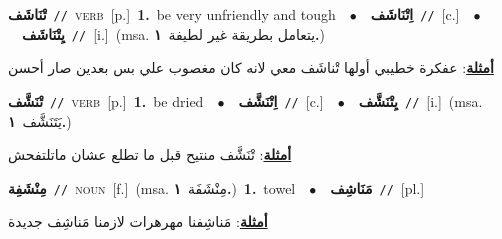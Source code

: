 \documentclass[10pt,a4paper,twoside]{article} %
\begin{document}
\begin{multicols}{2}
{\setlength\topsep{0pt}\textbf{\foreignlanguage{arabic}{تْنَاشَف}}\ {\color{gray}\texttt{//}\color{black}}\ \textsc{verb}\ [p.]\ \textbf{1.}~be very unfriendly and tough\ \ $\bullet$\ \ \setlength\topsep{0pt}\textbf{\foreignlanguage{arabic}{اِتْنَاشَف}}\ {\color{gray}\texttt{//}\color{black}}\ [c.]\ \ $\bullet$\ \ \setlength\topsep{0pt}\textbf{\foreignlanguage{arabic}{يِتْنَاشَف}}\ {\color{gray}\texttt{//}\color{black}}\ [i.]\ \color{gray}(msa. \foreignlanguage{arabic}{يتعامل بطريقة غير لطيفة}~\foreignlanguage{arabic}{\textbf{١.}})\color{black}\  \begin{flushright}\color{gray}\foreignlanguage{arabic}{\textbf{\underline{\foreignlanguage{arabic}{أمثلة}}}: عفكرة خطيبي أولها تْناشَف معي لانه كان مغصوب علي بس بعدين صار أحسن}\end{flushright}\color{black}} \vspace{2mm}

{\setlength\topsep{0pt}\textbf{\foreignlanguage{arabic}{تْنَشَّف}}\ {\color{gray}\texttt{//}\color{black}}\ \textsc{verb}\ [p.]\ \textbf{1.}~be dried\ \ $\bullet$\ \ \setlength\topsep{0pt}\textbf{\foreignlanguage{arabic}{اِتْنَشَّف}}\ {\color{gray}\texttt{//}\color{black}}\ [c.]\ \ $\bullet$\ \ \setlength\topsep{0pt}\textbf{\foreignlanguage{arabic}{يِتْنَشَّف}}\ {\color{gray}\texttt{//}\color{black}}\ [i.]\ \color{gray}(msa. \foreignlanguage{arabic}{يَتَنَشَّف}~\foreignlanguage{arabic}{\textbf{١.}})\color{black}\  \begin{flushright}\color{gray}\foreignlanguage{arabic}{\textbf{\underline{\foreignlanguage{arabic}{أمثلة}}}: تْنَشَّف منتيح قبل ما تطلع عشان ماتلتفحش}\end{flushright}\color{black}} \vspace{2mm}

{\setlength\topsep{0pt}\textbf{\foreignlanguage{arabic}{مِنْشَفِة}}\ {\color{gray}\texttt{//}\color{black}}\ \textsc{noun}\ [f.]\ \color{gray}(msa. \foreignlanguage{arabic}{مِنْشَفَة}~\foreignlanguage{arabic}{\textbf{١.}})\color{black}\ \textbf{1.}~towel\ \ $\bullet$\ \ \setlength\topsep{0pt}\textbf{\foreignlanguage{arabic}{مَنَاشِف}}\ {\color{gray}\texttt{//}\color{black}}\ [pl.]\  \begin{flushright}\color{gray}\foreignlanguage{arabic}{\textbf{\underline{\foreignlanguage{arabic}{أمثلة}}}: مَناشِفنا مهرهرات لازمنا مَناشِف جديدة}\end{flushright}\color{black}} \vspace{2mm}


\end{multicols}
\end{document}
